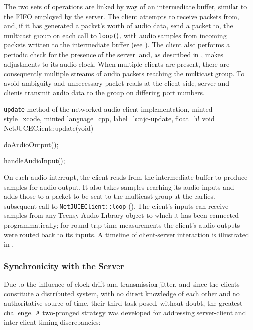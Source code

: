 The two sets of operations are linked by way of an intermediate buffer, similar
to the FIFO employed by the server.
The client attempts to receive packets from, and, if it has generated a packet's
worth of audio data, send a packet to, the multicast group on each call to
\texttt{loop()}, with audio samples from incoming packets written to the
intermediate buffer (see ).
The client also performs a periodic check for the presence of the server, and,
as described in , makes adjustments to its audio
clock.
When multiple clients are present, there are consequently multiple streams of
audio packets reaching the multicast group.
To avoid ambiguity and unnecessary packet reads at the client side, server and
clients transmit audio data to the group on differing port numbers.

\begin{codelisting}{
    \texttt{update} method of the networked audio client implementation,
    minted style=xcode,
    minted language=cpp,
    label=ls:njc-update,
    float=h!
}
    void NetJUCEClient::update(void) {
        doAudioOutput();

        handleAudioInput();
    }
\end{codelisting}

On each audio interrupt, the client reads from the intermediate buffer to
produce samples for audio output.
It also takes samples reaching its audio inputs and adds those to a packet to be
sent to the multicast group at the earliest subsequent call to
\texttt{NetJUCEClient::loop} ().
The client's inputs can receive samples from any Teensy Audio Library object to
which it has been connected programmatically;
for round-trip time measurements the client's audio outputs were routed back to
its inputs.
A timeline of client-server interaction is illustrated in .

\subsubsection{Synchronicity with the Server}\label{subsubsec:client-sync}

Due to the influence of clock drift and transmission jitter, and since the
clients constitute a distributed system, with no direct knowledge of each other
and no authoritative source of time, their third task posed, without doubt,
the greatest challenge.
A two-pronged strategy was developed for addressing server-client and
inter-client timing discrepancies:

